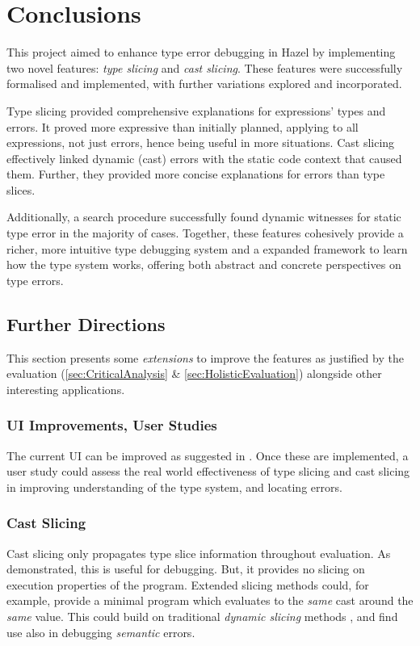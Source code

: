 \chapter{Conclusions}\label{chap:Conclusions}
This project aimed to enhance type error debugging in Hazel by implementing two novel features: \textit{type slicing} and \textit{cast slicing}. These features were successfully formalised and implemented, with further variations explored and incorporated.

Type slicing provided comprehensive explanations for expressions' types and errors. It proved more expressive than initially planned, applying to all expressions, not just errors, hence being useful in more situations. Cast slicing effectively linked dynamic (cast) errors with the static code context that caused them. Further, they provided more concise explanations for errors than type slices.

Additionally, a search procedure successfully found dynamic witnesses for static type error in the majority of cases. Together, these features cohesively provide a richer, more intuitive type debugging system and a expanded framework to learn how the type system works, offering both abstract and concrete perspectives on type errors.

\section{Further Directions}
This section presents some \textit{extensions} to improve the features as justified by the evaluation (\cref{sec:CriticalAnalysis} \& \ref{sec:HolisticEvaluation}) alongside other interesting {applications}. 

\subsection{UI Improvements, User Studies}
The current UI can be improved as suggested in . Once these are implemented, a user study could assess the real world effectiveness of type slicing and cast slicing in improving understanding of the type system, and locating errors.

\subsection{Cast Slicing}
Cast slicing only propagates type slice information throughout evaluation. As demonstrated, this is useful for debugging. But, it provides no slicing on execution properties of the program. Extended slicing methods could, for example, provide a minimal program which evaluates to the \textit{same} cast around the \textit{same} value. This could build on traditional \textit{dynamic slicing} methods \cite{DynProgSlice, FunctionalProgExplain}, and find use also in debugging \textit{semantic} errors.

